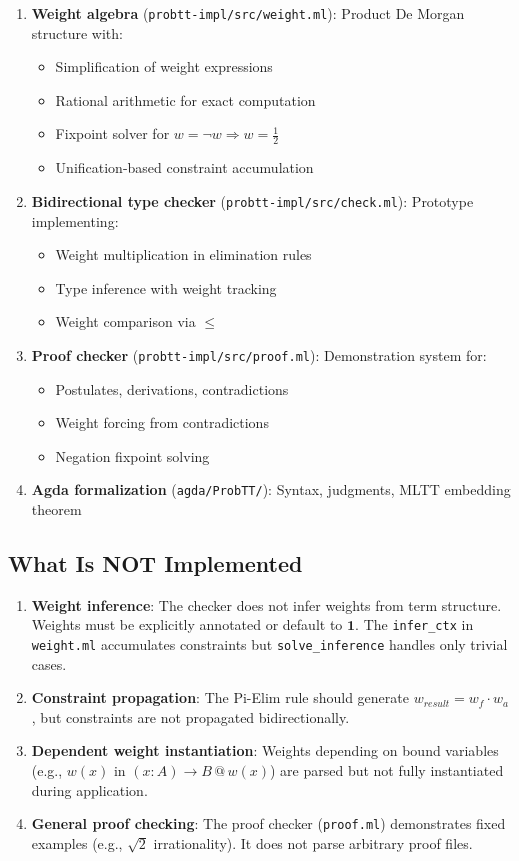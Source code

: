 \documentclass[11pt,a4paper]{article}
\makeatletter
\newcommand{\at}[1]{\,@\,#1}
\newcommand{\one}{\mathbf{1}}
\newcommand{\negw}{\neg}
\makeatother
\begin{document}
\begin{enumerate}
    \item \textbf{Weight algebra} (\texttt{probtt-impl/src/weight.ml}): Product De Morgan structure with:
    \begin{itemize}
        \item Simplification of weight expressions
        \item Rational arithmetic for exact computation
        \item Fixpoint solver for $w = \negw w \Rightarrow w = \frac{1}{2}$
        \item Unification-based constraint accumulation
    \end{itemize}
    \item \textbf{Bidirectional type checker} (\texttt{probtt-impl/src/check.ml}): Prototype implementing:
    \begin{itemize}
        \item Weight multiplication in elimination rules
        \item Type inference with weight tracking
        \item Weight comparison via $\leq$
    \end{itemize}
    \item \textbf{Proof checker} (\texttt{probtt-impl/src/proof.ml}): Demonstration system for:
    \begin{itemize}
        \item Postulates, derivations, contradictions
        \item Weight forcing from contradictions
        \item Negation fixpoint solving
    \end{itemize}
    \item \textbf{Agda formalization} (\texttt{agda/ProbTT/}): Syntax, judgments, MLTT embedding theorem
\end{enumerate}

\subsection{What Is NOT Implemented}

\begin{enumerate}
    \item \textbf{Weight inference}: The checker does not infer weights from term structure. Weights must be explicitly annotated or default to $\one$. The \texttt{infer\_ctx} in \texttt{weight.ml} accumulates constraints but \texttt{solve\_inference} handles only trivial cases.
    \item \textbf{Constraint propagation}: The Pi-Elim rule should generate $w_{result} = w_f \cdot w_a$, but constraints are not propagated bidirectionally.
    \item \textbf{Dependent weight instantiation}: Weights depending on bound variables (e.g., $w(x)$ in $(x : A) \to B \at{w(x)}$) are parsed but not fully instantiated during application.
    \item \textbf{General proof checking}: The proof checker (\texttt{proof.ml}) demonstrates fixed examples (e.g., $\sqrt{2}$ irrationality). It does not parse arbitrary proof files.
\end{enumerate}
\end{document}
